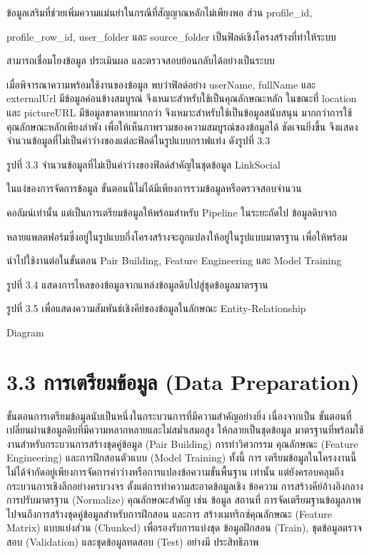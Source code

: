 \documentclass[12pt,a4paper]{report}
\begin{document}
ข้อมูลเสริมที่ช่วยเพิ่มความแม่นยำในกรณีที่สัญญาณหลักไม่เพียงพอ ส่วน profile\_id,\par
profile\_row\_id, user\_folder และ source\_folder เป็นฟิลด์เชิงโครงสร้างที่ทำให้ระบบ\par
สามารถเชื่อมโยงข้อมูล ประเมินผล และตรวจสอบย้อนกลับได้อย่างเป็นระบบ\par
เมื่อพิจารณาความพร้อมใช้งานของข้อมูล พบว่าฟิลด์อย่าง userName, fullName และ externalUrl มีข้อมูลค่อนข้างสมบูรณ์ จึงเหมาะสำหรับใช้เป็นคุณลักษณะหลัก ในขณะที่ location และ pictureURL มีข้อมูลขาดหายมากกว่า จึงเหมาะสำหรับใช้เป็นข้อมูลสนับสนุน มากกว่าการใช้คุณลักษณะหลักเพียงลำพัง เพื่อให้เห็นภาพรวมของความสมบูรณ์ของข้อมูลได้ ชัดเจนยิ่งขึ้น จึงแสดงจำนวนข้อมูลที่ไม่เป็นค่าว่างของแต่ละฟิลด์ในรูปแบบกราฟแท่ง ดังรูปที่ 3.3\par
\begin{center}\small รูปที่ 3.3 จำนวนข้อมูลที่ไม่เป็นค่าว่างของฟิลด์สำคัญในชุดข้อมูล LinkSocial\end{center}
\clearpage
ในแง่ของการจัดการข้อมูล ขั้นตอนนี้ไม่ได้มีเพียงการรวมข้อมูลหรือตรวจสอบจำนวน\par
คอลัมน์เท่านั้น แต่เป็นการเตรียมข้อมูลให้พร้อมสำหรับ Pipeline ในระยะถัดไป ข้อมูลดิบจาก\par
หลายแพลตฟอร์มซึ่งอยู่ในรูปแบบกึ่งโครงสร้างจะถูกแปลงให้อยู่ในรูปแบบมาตรฐาน เพื่อให้พร้อม\par
นำไปใช้งานต่อในขั้นตอน Pair Building, Feature Engineering และ Model Training\par
\begin{center}\small รูปที่ 3.4 แสดงการไหลของข้อมูลจากแหล่งข้อมูลดิบไปสู่ชุดข้อมูลมาตรฐาน\end{center}
\begin{center}\small รูปที่ 3.5 เพื่อแสดงความสัมพันธ์เชิงคีย์ของข้อมูลในลักษณะ Entity-Relationship\end{center}
Diagram\par
\clearpage
\section*{3.3 การเตรียมข้อมูล (Data Preparation)}
ขั้นตอนการเตรียมข้อมูลนับเป็นหนึ่งในกระบวนการที่มีความสำคัญอย่างยิ่ง เนื่องจากเป็น ขั้นตอนที่เปลี่ยนผ่านข้อมูลดิบที่มีความหลากหลายและไม่สม่ำเสมอสูง ให้กลายเป็นชุดข้อมูล มาตรฐานที่พร้อมใช้งานสำหรับกระบวนการสร้างชุดคู่ข้อมูล (Pair Building) การทำวิศวกรรม คุณลักษณะ (Feature Engineering) และการฝึกสอนตัวแบบ (Model Training) ทั้งนี้ การ เตรียมข้อมูลในโครงงานนี้ไม่ได้จำกัดอยู่เพียงการจัดการค่าว่างหรือการแปลงข้อความขั้นพื้นฐาน เท่านั้น แต่ยังครอบคลุมถึงกระบวนการเชิงลึกอย่างครบวงจร ตั้งแต่การทำความสะอาดข้อมูลเชิง ข้อความ การสร้างคีย์อ้างอิงกลาง การปรับมาตรฐาน (Normalize) คุณลักษณะสำคัญ เช่น ข้อมูล สถานที่ การจัดเตรียมฐานข้อมูลภาพ ไปจนถึงการสร้างชุดคู่ข้อมูลสำหรับการฝึกสอน และการ สร้างเมทริกซ์คุณลักษณะ (Feature Matrix) แบบแบ่งส่วน (Chunked) เพื่อรองรับการแบ่งชุด ข้อมูลฝึกสอน (Train), ชุดข้อมูลตรวจสอบ (Validation) และชุดข้อมูลทดสอบ (Test) อย่างมี ประสิทธิภาพ\par
\end{document}
